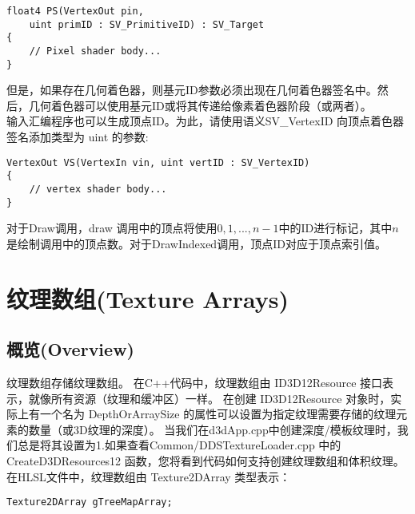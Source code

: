 \begin{lstlisting}
float4 PS(VertexOut pin, 
    uint primID : SV_PrimitiveID) : SV_Target
{
    // Pixel shader body...
}
\end{lstlisting}

\begin{flushleft}
但是，如果存在几何着色器，则基元ID参数必须出现在几何着色器签名中。然后，几何着色器可以使用基元ID或将其传递给像素着色器阶段（或两者）。\\

输入汇编程序也可以生成顶点ID。为此，请使用语义SV\_VertexID 向顶点着色器签名添加类型为 uint 的参数:\\
\end{flushleft}

\begin{lstlisting}
VertexOut VS(VertexIn vin, uint vertID : SV_VertexID)
{
    // vertex shader body...
}
\end{lstlisting}

\begin{flushleft}
对于Draw调用，draw 调用中的顶点将使用$0,1,...,n-1$中的ID进行标记，其中$n$是绘制调用中的顶点数。对于DrawIndexed调用，顶点ID对应于顶点索引值。\\
\end{flushleft}

\section{纹理数组(Texture Arrays)}
\subsection{概览(Overview)}
\begin{flushleft}
纹理数组存储纹理数组。 在C++代码中，纹理数组由 ID3D12Resource 接口表示，就像所有资源（纹理和缓冲区）一样。 在创建 ID3D12Resource 对象时，实际上有一个名为 DepthOrArraySize 的属性可以设置为指定纹理需要存储的纹理元素的数量（或3D纹理的深度）。 当我们在d3dApp.cpp中创建深度/模板纹理时，我们总是将其设置为1.如果查看Common/DDSTextureLoader.cpp 中的 CreateD3DResources12 函数，您将看到代码如何支持创建纹理数组和体积纹理。 在HLSL文件中，纹理数组由 Texture2DArray 类型表示：\\
\end{flushleft}

\begin{lstlisting}
Texture2DArray gTreeMapArray;
\end{lstlisting}

